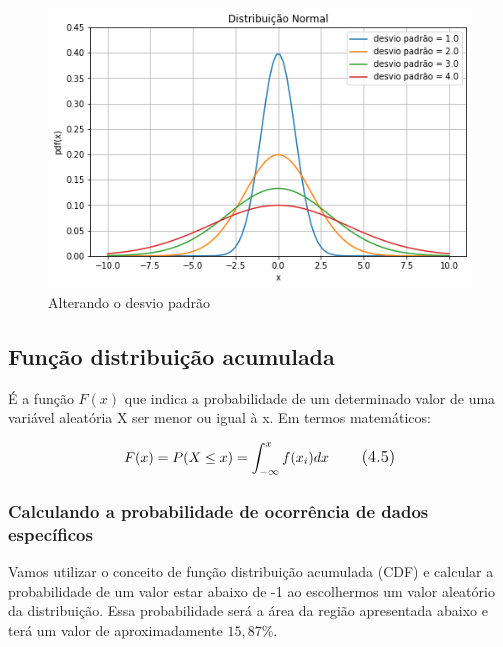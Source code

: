 \begin{figure}[H]
	\centering
	\includegraphics[width=1\textwidth]{./Imagens/Distribuição Normal/GA4.png} 
	\caption{Alterando o desvio padrão}
	\label{fig:GA4}
\end{figure}

\subsection{Função distribuição acumulada}

É a função $F(x)$ que indica a probabilidade de um determinado valor de uma variável aleatória X ser menor ou igual à x. Em termos matemáticos:

\begin{equation}
\large F(x) = P(X \leq x) = \int_{-\infty }^{x}f(x_{i})dx
\tag{4.5}
\end{equation}
	
\subsubsection{Calculando a probabilidade de ocorrência de dados específicos}

Vamos utilizar o conceito de função distribuição acumulada (CDF) e calcular a probabilidade de um valor estar abaixo de -1 ao escolhermos um valor aleatório da distribuição. Essa probabilidade será a área da região apresentada abaixo e terá um valor de aproximadamente $15,87\%$.

